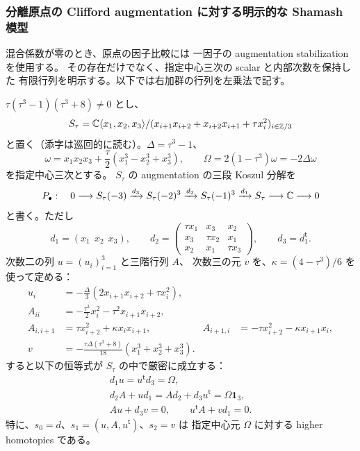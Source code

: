 \subsubsection{分離原点の Clifford augmentation に対する明示的な Shamash 模型}
\label{ifj:subsubsec:explicit-shamash}

混合係数が零のとき、原点の因子比較には
一因子の augmentation stabilization を使用する。
その存在だけでなく、指定中心三次の scalar と内部次数を保持した
有限行列を明示する。以下では右加群の行列を左乗法で記す。

\begin{proposition}
\label{ifj:prop:clifford-explicit-shamash}
$\tau(\tau^3-1)(\tau^3+8)\ne0$ とし、
\[
 S_\tau=\mathbb C\langle x_1,x_2,x_3\rangle/
 (x_{i+1}x_{i+2}+x_{i+2}x_{i+1}+\tau x_i^2)_{i\in\mathbb Z/3}
\]
と置く（添字は巡回的に読む）。$\Delta=\tau^3-1$、
\[
 \omega=x_1x_2x_3+\frac{\tau}{2}(x_1^3-x_2^3+x_3^3),
 \qquad \Omega=2(1-\tau^3)\omega=-2\Delta\omega
\]
を指定中心三次とする。
$S_\tau$ の augmentation の三段 Koszul 分解を
\[
 P_\bullet:\quad
 0\longrightarrow S_\tau(-3)
 \xrightarrow{d_3}S_\tau(-2)^3
 \xrightarrow{d_2}S_\tau(-1)^3
 \xrightarrow{d_1}S_\tau\longrightarrow\mathbb C\longrightarrow0
\]
と書く。ただし
\[
 d_1=(x_1\ \ x_2\ \ x_3),\qquad
 d_2=\begin{pmatrix}
 \tau x_1&x_3&x_2\\x_3&\tau x_2&x_1\\x_2&x_1&\tau x_3
 \end{pmatrix},\qquad d_3=d_1^{\mathsf t}.
\]
次数二の列 $u=(u_i)_{i=1}^3$ と三階行列 $A$、
次数三の元 $v$ を、$\kappa=(4-\tau^3)/6$ を使って定める：
\begin{equation}\label{ifj:eq:explicit-shamash-data}
 \begin{aligned}
 u_i&=-\frac{\Delta}{3}
            (2x_{i+1}x_{i+2}+\tau x_i^2),\\
 A_{ii}&=-\frac{\tau^3}{2}x_i^2
                -\tau^2x_{i+1}x_{i+2},\\
 A_{i,i+1}&=\tau x_{i+2}^2+\kappa x_ix_{i+1},
 & A_{i+1,i}&=-\tau x_{i+2}^2-\kappa x_{i+1}x_i,\\
 v&=-\frac{\tau\Delta(\tau^3+8)}{18}
                         (x_1^3+x_2^3+x_3^3).
 \end{aligned}
\end{equation}
すると以下の恒等式が $S_\tau$ の中で厳密に成立する：
\begin{equation}\label{ifj:eq:explicit-shamash-identities}
 \begin{gathered}
 d_1u=u^{\mathsf t}d_3=\Omega,\\
 d_2A+ud_1=A d_2+d_3u^{\mathsf t}=\Omega\mathbf1_3,\\
 Au+d_3v=0,\qquad u^{\mathsf t}A+vd_1=0.
 \end{gathered}
\end{equation}
特に、$s_0=d$、$s_1=(u,A,u^{\mathsf t})$、$s_2=v$ は
指定中心元 $\Omega$ に対する higher homotopies である。


\end{proposition}
